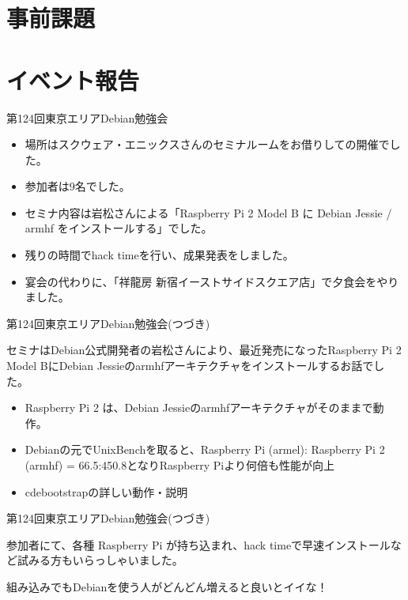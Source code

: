 \section{事前課題}
{\footnotesize

}

\section{イベント報告}

\begin{frame}{第124回東京エリアDebian勉強会}

\begin{itemize}
\item 場所はスクウェア・エニックスさんのセミナルームをお借りしての開催でした。
\item 参加者は9名でした。
\item セミナ内容は岩松さんによる「Raspberry Pi 2 Model B に Debian Jessie / armhf をインストールする」でした。
\item 残りの時間でhack timeを行い、成果発表をしました。
\item 宴会の代わりに、「祥龍房 新宿イーストサイドスクエア店」で夕食会をやりました。
\end{itemize} 
  
\end{frame}

\begin{frame}{第124回東京エリアDebian勉強会(つづき)}

 セミナはDebian公式開発者の岩松さんにより、最近発売になったRaspberry Pi 2 Model BにDebian Jessieのarmhfアーキテクチャをインストールするお話でした。

\begin{itemize}
\item Raspberry Pi 2 は、Debian Jessieのarmhfアーキテクチャがそのままで動作。
\item Debianの元でUnixBenchを取ると、Raspberry Pi (armel): Raspberry Pi 2 (armhf) = 66.5:450.8となりRaspberry Piより何倍も性能が向上
\item cdebootstrapの詳しい動作・説明
\end{itemize} 

\end{frame}

\begin{frame}{第124回東京エリアDebian勉強会(つづき)}

  参加者にて、各種 Raspberry Pi が持ち込まれ、hack timeで早速インストールなど試みる方もいらっしゃいました。
\begin{center}  
\LARGE
 組み込みでもDebianを使う人がどんどん増えると良いとイイな！
\end{center}

\end{frame}
  
